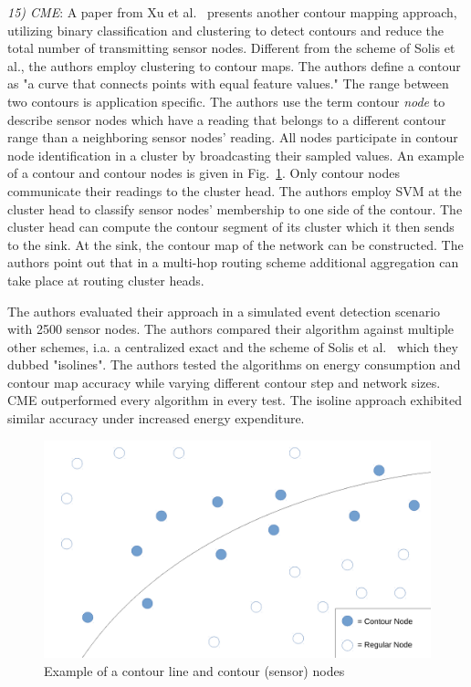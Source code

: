 \textit{15) \ac{CME}}: A paper from Xu et al.~\cite{xu2008cme} presents another
contour mapping approach, utilizing binary classification and clustering to
detect contours and reduce the total number of transmitting sensor nodes.
Different from the scheme of Solis et al., the authors employ clustering to
contour maps. The authors define a contour as "a curve that connects points
with equal feature values." The range between two contours is application
specific. The authors use the term contour \textit{node} to describe sensor
nodes which have a reading that belongs to a different contour range than a
neighboring sensor nodes' reading. All nodes participate in contour node
identification in a cluster by broadcasting their sampled values. An example of
a contour and contour nodes is given in Fig.~\ref{fig:contour nodes}. Only
contour nodes communicate their readings to the cluster head. The authors
employ \ac{SVM} at the cluster head to classify sensor nodes' membership to one
side of the contour. The cluster head can compute the contour segment of its
cluster which it then sends to the sink. At the sink, the contour map of the
network can be constructed. The authors point out that in a multi-hop routing
scheme additional aggregation can take place at routing cluster heads.

The authors evaluated their approach in a simulated event detection scenario
with 2500 sensor nodes. The authors compared their algorithm against multiple
other schemes, i.a. a centralized exact and the scheme of Solis et
al.~\cite{solis2005efficient} which they dubbed "isolines". The authors tested
the algorithms on energy consumption and contour map accuracy while varying
different contour step and network sizes. \ac{CME} outperformed every algorithm
in every test. The isoline approach exhibited similar accuracy under
increased energy expenditure.

\begin{figure}[h]
\includegraphics[width=\linewidth]{images/contour-nodes.pdf}
\caption{Example of a contour line and contour (sensor) nodes~\cite{xu2008cme}}
\label{fig:contour nodes}
\centering
\end{figure}

